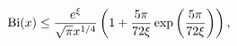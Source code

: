 \[\mathop{\mathrm{Bi}\/}\nolimits\!\left(x\right)\leq\frac{e^{\xi}}{\sqrt{\pi}x^%
{1/4}}\left(1+\frac{5\pi}{72\xi}\mathop{\exp\/}\nolimits\left(\frac{5\pi}{72%
\xi}\right)\right),\]